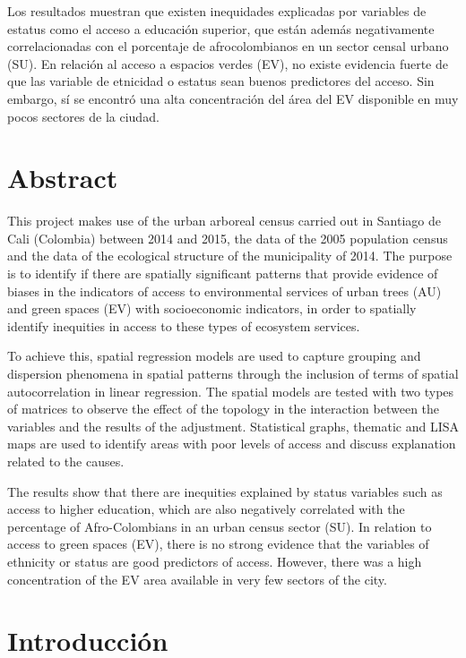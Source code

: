 \documentclass[12pt,]{book}
\begin{document}
Los resultados muestran que existen inequidades explicadas por variables
de estatus como el acceso a educación superior, que están además
negativamente correlacionadas con el porcentaje de afrocolombianos en un
sector censal urbano (SU). En relación al acceso a espacios verdes (EV),
no existe evidencia fuerte de que las variable de etnicidad o estatus
sean buenos predictores del acceso. Sin embargo, sí se encontró una alta
concentración del área del EV disponible en muy pocos sectores de la
ciudad.

\chapter*{Abstract}\label{abstract}

This project makes use of the urban arboreal census carried out in
Santiago de Cali (Colombia) between 2014 and 2015, the data of the 2005
population census and the data of the ecological structure of the
municipality of 2014. The purpose is to identify if there are spatially
significant patterns that provide evidence of biases in the indicators
of access to environmental services of urban trees (AU) and green spaces
(EV) with socioeconomic indicators, in order to spatially identify
inequities in access to these types of ecosystem services.

To achieve this, spatial regression models are used to capture grouping
and dispersion phenomena in spatial patterns through the inclusion of
terms of spatial autocorrelation in linear regression. The spatial
models are tested with two types of matrices to observe the effect of
the topology in the interaction between the variables and the results of
the adjustment. Statistical graphs, thematic and LISA maps are used to
identify areas with poor levels of access and discuss explanation
related to the causes.

The results show that there are inequities explained by status variables
such as access to higher education, which are also negatively correlated
with the percentage of Afro-Colombians in an urban census sector (SU).
In relation to access to green spaces (EV), there is no strong evidence
that the variables of ethnicity or status are good predictors of access.
However, there was a high concentration of the EV area available in very
few sectors of the city.

\chapter{Introducción}\label{intro}
\end{document}
